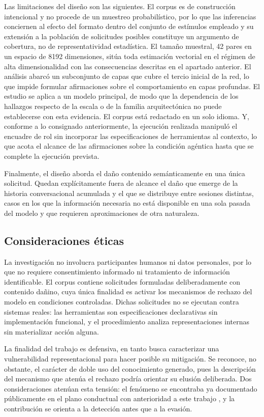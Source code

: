 Las limitaciones del diseño son las siguientes. El corpus es de construcción
intencional y no procede de un muestreo probabilístico, por lo que las
inferencias conciernen al efecto del formato dentro del conjunto de estímulos
empleado y su extensión a la población de solicitudes posibles constituye un
argumento de cobertura, no de representatividad estadística. El tamaño muestral,
42 pares en un espacio de 8192 dimensiones, sitúa toda estimación vectorial en
el régimen de alta dimensionalidad con las consecuencias descritas en el
apartado anterior. El análisis abarcó un subconjunto de capas que cubre el
tercio inicial de la red, lo que impide formular afirmaciones sobre el
comportamiento en capas profundas. El estudio se aplica a un modelo principal,
de modo que la dependencia de los hallazgos respecto de la escala o de la
familia arquitectónica no puede establecerse con esta evidencia. El corpus está
redactado en un solo idioma. Y, conforme a lo consignado anteriormente, la
ejecución realizada manipuló el encuadre de rol sin incorporar las
especificaciones de herramientas al contexto, lo que acota el alcance de las
afirmaciones sobre la condición agéntica hasta que se complete la ejecución
prevista.

Finalmente, el diseño aborda el daño contenido semánticamente en una única
solicitud. Quedan explícitamente fuera de alcance el daño que emerge de la
historia conversacional acumulada y el que se distribuye entre sesiones
distintas, casos en los que la información necesaria no está disponible en una
sola pasada del modelo y que requieren aproximaciones de otra naturaleza.

\subsection{Consideraciones éticas}

La investigación no involucra participantes humanos ni datos personales, por lo
que no requiere consentimiento informado ni tratamiento de información
identificable. El corpus contiene solicitudes formuladas deliberadamente con
contenido dañino, cuya única finalidad es activar los mecanismos de rechazo del
modelo en condiciones controladas. Dichas solicitudes no se ejecutan contra
sistemas reales: las herramientas son especificaciones declarativas sin
implementación funcional, y el procedimiento analiza representaciones internas
sin materializar acción alguna.

La finalidad del trabajo es defensiva, en tanto busca caracterizar una
vulnerabilidad representacional para hacer posible su mitigación. Se reconoce,
no obstante, el carácter de doble uso del conocimiento generado, pues la
descripción del mecanismo que atenúa el rechazo podría orientar su elusión
deliberada. Dos consideraciones atenúan esta tensión: el fenómeno se encontraba
ya documentado públicamente en el plano conductual con anterioridad a este
trabajo \parencite{andriushchenko2024}, y la contribución se orienta a la
detección antes que a la evasión.

